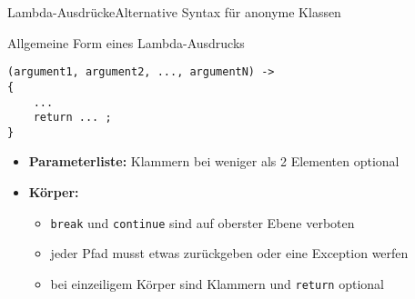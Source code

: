 \begin{frame}[fragile]{Lambda-Ausdrücke}{Alternative Syntax für anonyme Klassen}

    \begin{center}
        \begin{minipage}[b]{0.75\textwidth}
            \begin{block}{Allgemeine Form eines Lambda-Ausdrucks \citep{goetz13}}
                \begin{lstlisting}
(argument1, argument2, ..., argumentN) -> 
{
    ... 
    return ... ;
}
                \end{lstlisting}
            \end{block}
        \end{minipage}
    \end{center}
    
    \begin{itemize}
        \item<2->\textbf{Parameterliste:} Klammern bei weniger als 2 Elementen optional
        \item<3->\textbf{Körper:} 
        \begin{itemize}
            \item<3-> \texttt{break} und \texttt{continue} sind auf oberster Ebene verboten
            \item<4-> jeder Pfad musst etwas zurückgeben oder eine Exception werfen
            \item<5-> bei einzeiligem Körper sind Klammern und \texttt{return} optional
        \end{itemize}
    \end{itemize}
\end{frame}


